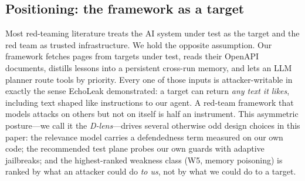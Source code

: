 \subsection{Positioning: the framework as a target}\label{sec:positioning}

Most red-teaming literature treats the AI system under test as the target and the
red team as trusted infrastructure. We hold the opposite assumption. Our framework
fetches pages from targets under test, reads their OpenAPI documents, distills
lessons into a persistent cross-run memory, and lets an LLM planner route tools by
priority. Every one of those inputs is attacker-writable in exactly the sense
EchoLeak demonstrated: a target can return \emph{any text it likes}, including text
shaped like instructions to our agent. A red-team framework that models attacks on
others but not on itself is half an instrument. This asymmetric posture---we call
it the \emph{D-lens}---drives several otherwise odd design choices in this paper:
the relevance model carries a defendedness term measured on our own code; the
recommended test plane probes our own guards with adaptive jailbreaks; and the
highest-ranked weakness class (W5, memory poisoning) is ranked by what an attacker
could do \emph{to us}, not by what we could do to a target.
